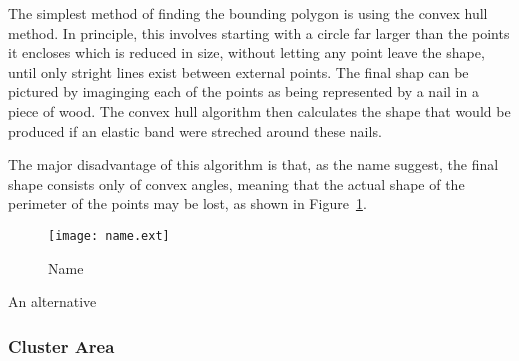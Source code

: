 The simplest method of finding the bounding polygon is using the convex hull
method\cite{}. In principle, this involves starting with a circle far larger
than the points it encloses which is reduced in size, without letting any point
leave the shape, until only stright lines exist between external points. The
final shap can be pictured by imaginging each of the points as being
represented by a nail in a piece of wood. The convex hull algorithm then
calculates the shape that would be produced if an elastic band were streched
around these nails.

The major disadvantage of this algorithm is that, as the name suggest, the
final shape consists only of convex angles, meaning that the actual shape of
the perimeter of the points may be lost, as shown in
Figure~\ref{fig:convex-hull}.

\begin{figure}[tbhp]
	\centering
	\texttt{[image: name.ext]}
	\caption{Name}
	\label{fig:convex-hull}
\end{figure}

An alternative

\cite{lee2002polygonization}

\cite{estivill2000autoclust}

\cite{xia2006border}

\cite{lee1980two}

\subsubsection{Cluster Area}
\label{ssub:cluster_area_point}

